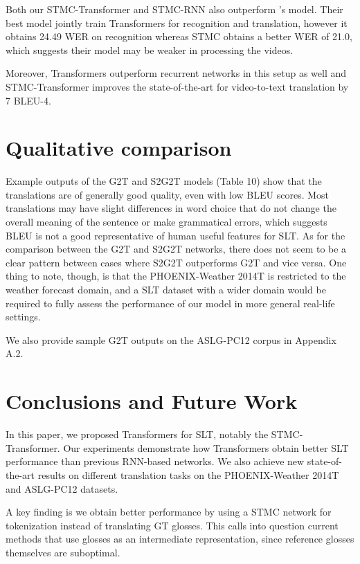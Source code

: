 \documentclass[11pt]{article}
\begin{document}
Both our STMC-Transformer and STMC-RNN also outperform 's model. Their best model jointly train Transformers for recognition and translation, however it obtains 24.49 WER on recognition whereas STMC obtains a better WER of 21.0, which suggests their model may be weaker in processing the videos. 

Moreover, Transformers outperform recurrent networks in this setup as well and STMC-Transformer improves the state-of-the-art for video-to-text translation by 7 BLEU-4.

\section{Qualitative comparison}



Example outputs of the G2T and S2G2T models (Table 10) show that the translations are of generally good quality, even with low BLEU scores. Most translations may have slight differences in word choice that do not change the overall meaning of the sentence or make grammatical errors, which suggests BLEU is not a good representative of human useful features for SLT. As for the comparison between the G2T and S2G2T networks, there does not seem to be a clear pattern between cases where S2G2T outperforms G2T and vice versa. One thing to note, though, is that the PHOENIX-Weather 2014T is restricted to the weather forecast domain, and a SLT dataset with a wider domain would be required to fully assess the performance of our model in more general real-life settings.

We also provide sample G2T outputs on the ASLG-PC12 corpus in Appendix A.2. 

\section{Conclusions and Future Work}
In this paper, we proposed Transformers for SLT, notably the STMC-Transformer. Our experiments demonstrate how Transformers obtain better SLT performance than previous RNN-based networks. We also achieve new state-of-the-art results on different translation tasks on the PHOENIX-Weather 2014T and ASLG-PC12 datasets.

A key finding is we obtain better performance by using a STMC network for tokenization instead of translating GT glosses. This calls into question current methods that use glosses as an intermediate representation, since reference glosses themselves are suboptimal. 
\end{document}
